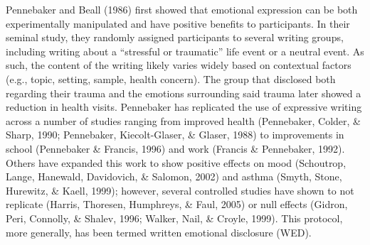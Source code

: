\documentclass[man, mask]{apa6}
\theoremstyle{definition}
\theoremstyle{definition}
\theoremstyle{definition}
\theoremstyle{remark}
\begin{document}
Pennebaker and Beall (1986) first showed that emotional expression can
be both experimentally manipulated and have positive benefits to
participants. In their seminal study, they randomly assigned
participants to several writing groups, including writing about a
\enquote{stressful or traumatic} life event or a neutral event. As such,
the content of the writing likely varies widely based on contextual
factors (e.g., topic, setting, sample, health concern). The group that
disclosed both regarding their trauma and the emotions surrounding said
trauma later showed a reduction in health visits. Pennebaker has
replicated the use of expressive writing across a number of studies
ranging from improved health (Pennebaker, Colder, \& Sharp, 1990;
Pennebaker, Kiecolt-Glaser, \& Glaser, 1988) to improvements in school
(Pennebaker \& Francis, 1996) and work (Francis \& Pennebaker, 1992).
Others have expanded this work to show positive effects on mood
(Schoutrop, Lange, Hanewald, Davidovich, \& Salomon, 2002) and asthma
(Smyth, Stone, Hurewitz, \& Kaell, 1999); however, several controlled
studies have shown to not replicate (Harris, Thoresen, Humphreys, \&
Faul, 2005) or null effects (Gidron, Peri, Connolly, \& Shalev, 1996;
Walker, Nail, \& Croyle, 1999). This protocol, more generally, has been
termed written emotional disclosure (WED).
\end{document}
